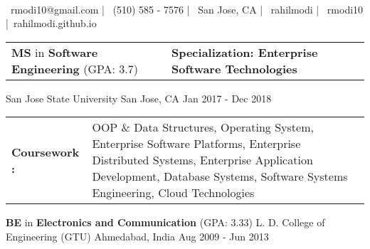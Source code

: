 \documentclass[]{awesome-cv}
\begin{document}
\begin{center}
	  \\
	\vspace{1mm}
	{\faEnvelope\ rmodi10@gmail.com} | {\faMobile\ (510) 585 - 7576} | {\faMapMarker\ San Jose, CA} | {\faGithub\ rahilmodi} | {\faLinkedin\ rmodi10} |{\faLink\ rahilmodi.github.io}
\end{center}
\begin{cventries}
	\cventry
	{
	\begin{tabular}{ l l }
        \textbf{MS} in \textbf{Software Engineering} (GPA: 3.7)\hspace{1.75cm} & \textbf{Specialization: Enterprise Software Technologies} \\ 
    \end{tabular}
    }
	{San Jose State University}
	{San Jose, CA}
	{Jan 2017 - Dec 2018}
	{
	\begin{cvcoursework}
	\vspace{2mm}
	\begin{tabular}{  m{6em}  m{16cm} } 
    \textbf{Coursework : }& {OOP \& Data Structures, Operating System, Enterprise Software Platforms, Enterprise Distributed Systems, Enterprise Application Development, Database Systems, Software Systems Engineering, Cloud Technologies} \\ 
    \end{tabular}
    \end{cvcoursework}
	}
	{}
	\cventry
	{
        \textbf{BE} in \textbf{Electronics and Communication} (GPA: 3.33) 
    }
	{L. D. College of Engineering (GTU)}
	{Ahmedabad, India}
	{Aug 2009 - Jun 2013}
	{}
\end{cventries}
\end{document}

